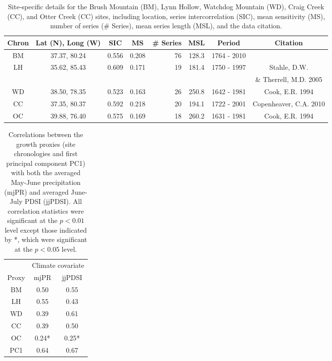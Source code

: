 \begin{table}
\begin{center}
\begin{tabular}{ccccrccc} \toprule
Chron & Lat (N), Long (W) & SIC   & MS    & \# Series & MSL & Period      & Citation\\ \midrule
BM    &  37.37, 80.24 & 0.556 & 0.208 & 76        & 128.3              & 1764 - 2010 &         \\
LH    &  35.62, 85.43 & 0.609 & 0.171 & 19        & 181.4              & 1750 - 1997 &  Stahle, D.W.           \\
      &               &       &       &           &                    &             &  \& Therrell, M.D. 2005 \\
WD    &  38.50, 78.35 & 0.523 & 0.163 & 26        & 250.8              & 1642 - 1981 &  Cook, E.R. 1994  \\
CC    &  37.35, 80.37 & 0.592 & 0.218 & 20        & 194.1              & 1722 - 2001 &  Copenheaver, C.A. 2010 \\
OC    &  39.88, 76.40 & 0.575 & 0.169 & 18        & 260.2              & 1631 - 1981 &  Cook, E.R. 1994  \\
\bottomrule
\end{tabular}
\end{center}
\caption{Site-specific details for the Brush Mountain (BM), Lynn Hollow, Watchdog Mountain (WD), Craig Creek (CC), and Otter Creek (CC) sites, including location, series intercorrelation (SIC), mean sensitivity (MS), number of series (\# Series), mean series length (MSL), and the data citation. }
\label{table:chronStats}
\vspace{2cm}
\end{table}

\begin{table}
\begin{center}
\begin{tabular}{ccc} \toprule
 & \multicolumn{2}{c}{Climate covariate} \\
Proxy & mjPR & jjPDSI \\ \midrule
BM    & 0.50  & 0.55  \\
LH    & 0.55  & 0.43  \\
WD    & 0.39  & 0.61  \\   
CC    & 0.39  & 0.50  \\
OC    & 0.24* & 0.25*   \\
PC1   & 0.64  & 0.67 \\ \bottomrule
\end{tabular}
\caption{Correlations between the growth proxies (site chronologies and first principal component PC1) with both the averaged May-June precipitation (mjPR) and averaged June-July PDSI (jjPDSI). All correlation statistics were significant at the $p<0.01$ level except those indicated by *, which were significant at the $p<0.05$ level.}
\end{center}
\label{table:moistureCorrs}
\vspace{2cm}
\end{table}

